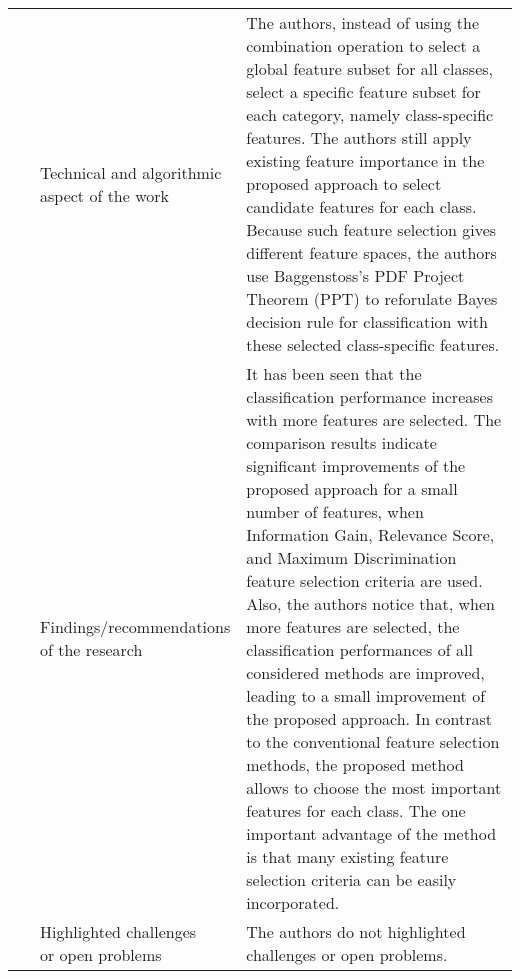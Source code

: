 \begin{landscape}
\begin{longtable}{lp{}p{}}
	\multirow{3}[0]{*}{~\citep{Tang2016}} & 
    \specialcell{Technical and algorithmic \\ aspect of the work} &
    The authors, instead of using the combination operation to select a global feature subset for all classes, select a specific feature subset for each category, namely class-specific features. The authors still apply existing feature importance in the proposed approach to select candidate features for each class. Because such feature selection gives different feature spaces, the authors use Baggenstoss’s PDF Project Theorem (PPT) to reforulate Bayes decision rule for classification with these selected class-specific features.      
    \\ & 
    \specialcell{Findings/recommendations \\ of the research} & 
    It has been seen that the classification performance increases with more features are selected. The comparison results indicate significant improvements of the proposed approach for a small number of features, when Information Gain, Relevance Score, and Maximum Discrimination feature selection criteria are used. Also, the authors notice that, when more features are selected, the classification performances of all considered methods are improved, leading to a small improvement of the proposed approach. In contrast to the conventional feature selection methods, the proposed method allows to choose the most important features for each class. The one important advantage of the method is that many existing feature selection criteria can be easily incorporated. 
    \\ & 
    \specialcell{Highlighted challenges \\ or open problems} & 
    The authors do not highlighted challenges or open problems. 
	\\
	

\end{longtable}
\end{landscape}
